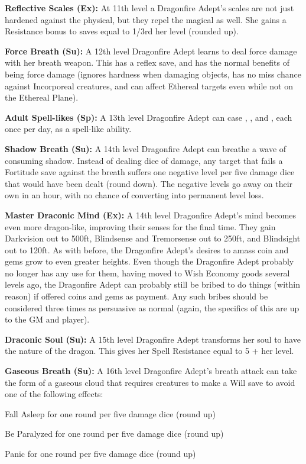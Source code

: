 \textbf{Reflective Scales (Ex):} At 11th level a Dragonfire Adept's scales are not just hardened against the physical, but they repel the magical as well. She gains a Resistance bonus to saves equal to 1/3rd her level (rounded up).

\textbf{Force Breath (Su):} A 12th level Dragonfire Adept learns to deal force damage with her breath weapon. This has a reflex save, and has the normal benefits of being force damage (ignores hardness when damaging objects, has no miss chance against Incorporeal creatures, and can affect Ethereal targets even while not on the Ethereal Plane).

\textbf{Adult Spell-likes (Sp):} A 13th level Dragonfire Adept can case , , and , each once per day, as a spell-like ability.

\textbf{Shadow Breath (Su):} A 14th level Dragonfire Adept can breathe a wave of consuming shadow. Instead of dealing dice of damage, any target that fails a Fortitude save against the breath suffers one negative level per five damage dice that would have been dealt (round down). The negative levels go away on their own in an hour, with no chance of converting into permanent level loss.

\textbf{Master Draconic Mind (Ex):} A 14th level Dragonfire Adept's mind becomes even more dragon-like, improving their senses for the final time. They gain Darkvision out to 500ft, Blindsense and Tremorsense out to 250ft, and Blindsight out to 120ft. As with before, the Dragonfire Adept's desires to amass coin and gems grow to even greater heights. Even though the Dragonfire Adept probably no longer has any use for them, having moved to Wish Economy goods several levels ago, the Dragonfire Adept can probably still be bribed to do things (within reason) if offered coins and gems as payment. Any such bribes should be considered three times as persuasive as normal (again, the specifics of this are up to the GM and player).

\textbf{Draconic Soul (Su):} A 15th level Dragonfire Adept transforms her soul to have the nature of the dragon. This gives her Spell Resistance equal to 5 + her level.

\textbf{Gaseous Breath (Su):} A 16th level Dragonfire Adept's breath attack can take the form of a gaseous cloud that requires creatures to make a Will save to avoid one of the following effects:

\begin{itemize*}
\item Fall Asleep for one round per five damage dice (round up)
\item Be Paralyzed for one round per five damage dice (round up)
\item Panic for one round per five damage dice (round up)
\end{itemize*}

